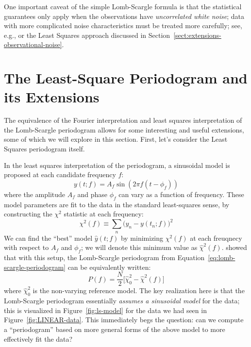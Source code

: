 \documentclass[preprint]{aastex}
\newcommand{\fig}[1]{Figure~\ref{fig:#1}}
\newcommand{\Eq}[1]{Equation~\ref{eq:#1}}
\newcommand{\eq}[1]{\Eq{#1}}
\newcommand{\eqlabel}[1]{\label{eq:#1}}
\newcommand{\Sect}[1]{Section~\ref{sect:#1}}
\newcommand{\sect}[1]{\Sect{#1}}
\newcommand{\sectlabel}[1]{\label{sect:#1}}
\begin{document}
One important caveat of the simple Lomb-Scargle formula is that the statistical
guarantees only apply when the observations have {\it uncorrelated white
noise}; data with more complicated noise characteristics must be treated
more carefully; see, e.g., \citet{Vio2010} or the Least Squares approach
discussed in \sect{extensions-observational-noise}.


\section{The Least-Square Periodogram and its Extensions}
\sectlabel{lomb-scargle-extensions}

The equivalence of the Fourier interpretation and least squares interpretation of the Lomb-Scargle periodogram allows for some interesting and useful
extensions, some of which we will explore in this section.
First, let's consider the Least Squares periodogram itself.

In the least squares interpretation of the periodogram, a sinusoidal model is proposed at each candidate frequency $f$:
\begin{equation}
  y(t;f) = A_f \sin(2 \pi f (t - \phi_f))
\end{equation}
where the amplitude $A_f$ and phase $\phi_f$ can vary as a function of frequency.
These model parameters are fit to the data in the standard least-squares sense,
by constructing the $\chi^2$ statistic at each frequency:
\begin{equation}
  \chi^2(f) \equiv \sum_n \big(y_n - y(t_n;f)\big)^2
  \eqlabel{chi2-simple}
\end{equation}
We can find the ``best'' model $\hat{y}(t;f)$ by minimizing $\chi^2(f)$ at
each freuqnecy with respect to $A_f$ and $\phi_f$;
we will denote this minimum value as $\hat{\chi}^2(f)$.
\citet{Scargle82} showed that with this setup, the Lomb-Scargle
periodogram from \eq{lomb-scargle-periodogram} can be equivalently written:
\begin{equation}
  P(f) = \frac{N}{2}\big[\hat{\chi}^2_0 - \hat{\chi}^2(f)\big]
  \eqlabel{lomb-scargle-chi2}
\end{equation}
where $\hat{\chi}^2_0$ is the non-varying reference model.
The key realization here is that the Lomb-Scargle periodogram essentially
{\it assumes a sinusoidal model} for the data; this is visualized in
\fig{ls-model} for the data we had seen in \fig{LINEAR-data}.
This immediately begs the question: can we compute a ``periodogram'' based
on more general forms of the above model to more effectively fit the data?
\end{document}
